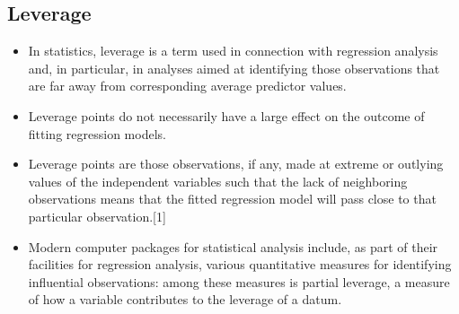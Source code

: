 \documentclass[residuals.tex]{subfiles}
\begin{document}
\subsection{Leverage}
\begin{itemize}
\item In statistics, leverage is a term used in connection with regression analysis and, in particular, in analyses aimed at identifying those observations that are far away from corresponding average predictor values.

\item  Leverage points do not necessarily have a large effect on the outcome of fitting regression models.

\item Leverage points are those observations, if any, made at extreme or outlying values of the independent variables such that the lack of neighboring observations means that the fitted regression model will pass close to that particular observation.[1]

\item Modern computer packages for statistical analysis include, as part of their facilities for regression analysis, various quantitative measures for identifying influential observations: among these measures is partial leverage, a measure of how a variable contributes to the leverage of a datum.

\end{itemize}
\end{document}
